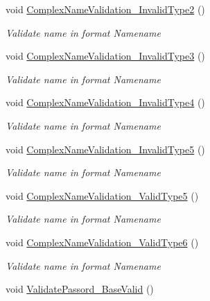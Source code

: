\begin{DoxyCompactItemize}
void \mbox{\hyperlink{class_a_c_tests_1_1_tests_1_1_regex_a03bf0183457b42a3ee58797e4487e12c}{Complex\+Name\+Validation\+\_\+\+Invalid\+Type2}} ()
\begin{DoxyCompactList}\small\item\em Validate name in format Name\textquotesingle{}name \end{DoxyCompactList}\item 
void \mbox{\hyperlink{class_a_c_tests_1_1_tests_1_1_regex_ad8e5a2559a926adfa951a1c77e15b7c2}{Complex\+Name\+Validation\+\_\+\+Invalid\+Type3}} ()
\begin{DoxyCompactList}\small\item\em Validate name in format Name\textquotesingle{}name \end{DoxyCompactList}\item 
void \mbox{\hyperlink{class_a_c_tests_1_1_tests_1_1_regex_a4c1e6b16ab813575058ab69045c9cc56}{Complex\+Name\+Validation\+\_\+\+Invalid\+Type4}} ()
\begin{DoxyCompactList}\small\item\em Validate name in format Name\textquotesingle{}name \end{DoxyCompactList}\item 
void \mbox{\hyperlink{class_a_c_tests_1_1_tests_1_1_regex_ac6bf5f9fb4509575986b5aa2cc0d0591}{Complex\+Name\+Validation\+\_\+\+Invalid\+Type5}} ()
\begin{DoxyCompactList}\small\item\em Validate name in format Name\textquotesingle{}name \end{DoxyCompactList}\item 
void \mbox{\hyperlink{class_a_c_tests_1_1_tests_1_1_regex_ad4ccc3b1d1143ec5b283aaa591b92eb3}{Complex\+Name\+Validation\+\_\+\+Valid\+Type5}} ()
\begin{DoxyCompactList}\small\item\em Validate name in format Name\textquotesingle{}name \end{DoxyCompactList}\item 
void \mbox{\hyperlink{class_a_c_tests_1_1_tests_1_1_regex_a6f9df1fe79f692c303c0c951854b0023}{Complex\+Name\+Validation\+\_\+\+Valid\+Type6}} ()
\begin{DoxyCompactList}\small\item\em Validate name in format Name\textquotesingle{}name \end{DoxyCompactList}\item 
void \mbox{\hyperlink{class_a_c_tests_1_1_tests_1_1_regex_a7d4db91d7ffad80212ba5b9eee205ef0}{Validate\+Passord\+\_\+\+Base\+Valid}} ()

\end{DoxyCompactItemize}
